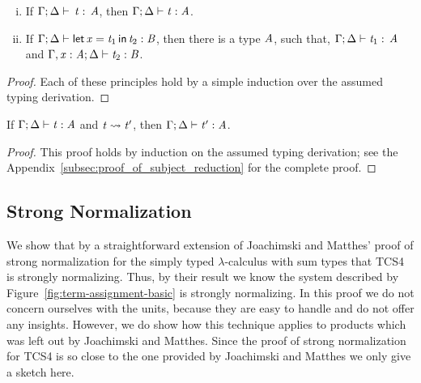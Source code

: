 \begin{lemma}[Inversion]
\begin{enumerate}[i.]
  \item If $\Gamma  ;  \Delta  \vdash  \relax \, \mathit{t}  :  \relax \, \mathit{A}$, then $\Gamma  ;  \Delta  \vdash  \mathit{t}  :  \mathit{A}$.
  \item If $\Gamma  ;  \Delta  \vdash   \mathsf{let}\,\relax  \mathit{x}  =  \mathit{t_{{\mathrm{1}}}} \,\mathsf{in}\, \mathit{t_{{\mathrm{2}}}}   :  \mathit{B}$, then there is a type $\mathit{A}$, such that,
    $\Gamma  ;  \Delta  \vdash  \mathit{t_{{\mathrm{1}}}}  :  \relax \, \mathit{A}$ and $\Gamma  ,  \mathit{x}  :  \mathit{A}  ;  \Delta  \vdash  \mathit{t_{{\mathrm{2}}}}  :  \mathit{B}$.
  \end{enumerate}
\end{lemma}
\begin{proof}
  Each of these principles hold by a simple induction over the assumed
  typing derivation.
\end{proof}

\begin{lemma}
  \label{lemma:subject_reduction}
  If $\Gamma  ;  \Delta  \vdash  \mathit{t}  :  \mathit{A}$ and $\mathit{t}  \rightsquigarrow  \mathit{t'}$, then $\Gamma  ;  \Delta  \vdash  \mathit{t'}  :  \mathit{A}$.
\end{lemma}
\begin{proof}
  This proof holds by induction on the assumed typing derivation; see
  the Appendix~\ref{subsec:proof_of_subject_reduction} for the
  complete proof.
\end{proof}

\subsection{Strong Normalization}
\label{subsec:strong_normalization}

We show that by a straightforward extension of Joachimski and Matthes'
\cite{Joachimski:2003} proof of strong normalization for the simply
typed $\lambda$-calculus with sum types that TCS4 is strongly
normalizing.  Thus, by their result we know the system described by
Figure~\ref{fig:term-assignment-basic} is strongly normalizing.  In
this proof we do not concern ourselves with the units, because they
are easy to handle and do not offer any insights.  However, we do show
how this technique applies to products which was left out by
Joachimski and Matthes.  Since the proof of strong normalization for
TCS4 is so close to the one provided by Joachimski and Matthes we only
give a sketch here.

